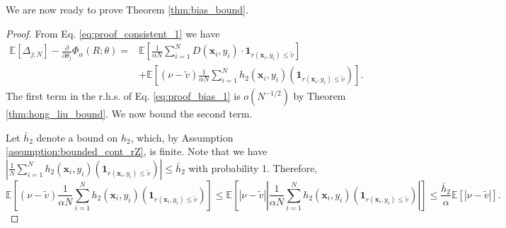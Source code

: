 \documentclass[letterpaper]{article}
\newcommand{\E}{\mathbb{E}}
\newcommand{\cvar}{\Phi_\alpha}
\newcommand{\bx}{\mathbf{x}}
\newcommand{\Dth}{\frac{\partial}{\partial \theta_j}}
\newcommand{\dcvar}{\Delta_{j;N}} %
\newcommand{\evar}{\tilde{v}}  %
\begin{document}
We are now ready to prove Theorem \ref{thm:bias_bound}.
\begin{proof}
From Eq. \eqref{eq:proof_consistent_1} we have
\begin{equation}\label{eq:proof_bias_1}
\begin{split}
\E \left[ \dcvar \right] - \Dth\cvar (R;\theta) = &\E \left[ \frac{1}{\alpha N}\sum_{i=1}^{N} D(\bx_i,y_i) \cdot \mathbf{1}_{r(\bx_{i},y_i)\leq \evar}\right]\\
&+ \E \left[ \left( \nu - \evar \right) \frac{1}{\alpha N} \sum_{i=1}^{N} h_2(\bx_i,y_i)\left(\mathbf{1}_{r(\bx_{i},y_i)\leq \evar} \right) \right].
\end{split}
\end{equation}
The first term in the r.h.s. of Eq. \eqref{eq:proof_bias_1} is $o(N^{-1/2})$ by Theorem \ref{thm:hong_liu_bound}. We now bound the second term.

Let $\bar{h}_2$ denote a bound on $h_2$, which, by Assumption \ref{assumption:bounded_cont_rZ}, is finite. Note that we have $\left| \frac{1}{N} \sum_{i=1}^{N} h_2(\bx_i,y_i)\left(\mathbf{1}_{r(\bx_{i},y_i)\leq \evar} \right) \right| \leq \bar{h}_2$ with probability 1.
Therefore,
\begin{equation*}\label{eq:proof_bias_2}
\E \left[ \left( \nu - \evar \right) \frac{1}{\alpha N} \sum_{i=1}^{N} h_2(\bx_i,y_i)\left(\mathbf{1}_{r(\bx_{i},y_i)\leq \evar} \right) \right] \leq \E \left[ \left| \nu - \evar \right| \left| \frac{1}{\alpha N} \sum_{i=1}^{N} h_2(\bx_i,y_i)\left(\mathbf{1}_{r(\bx_{i},y_i)\leq \evar} \right) \right| \right] \leq \frac{\bar{h}_2}{\alpha} \E \left[ \left| \nu - \evar \right| \right].
\end{equation*}


\end{proof}
\end{document}
